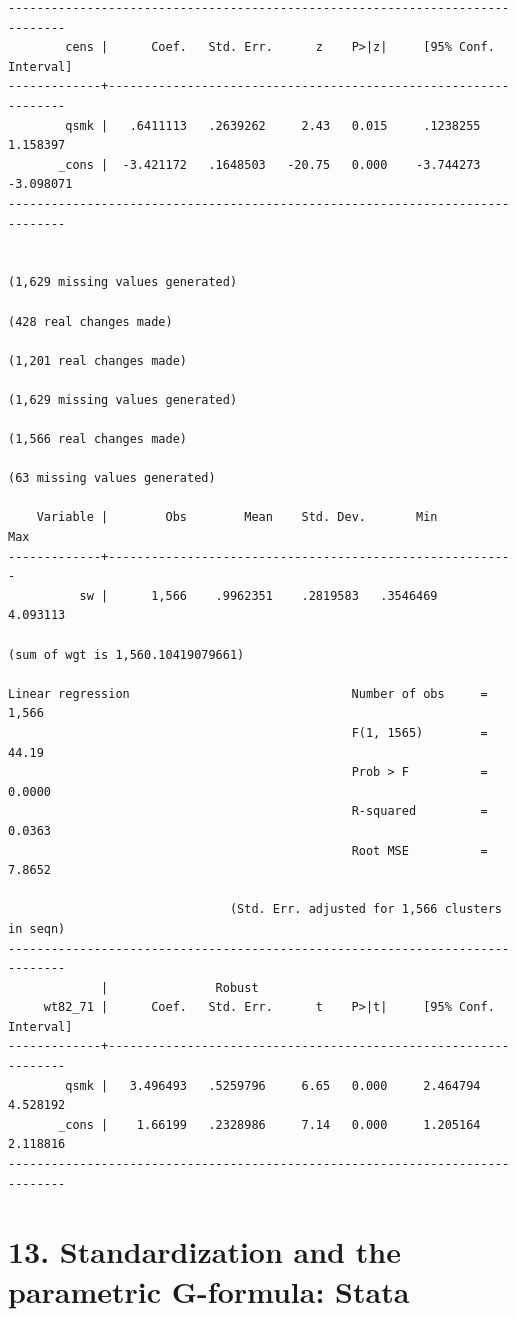 \documentclass[
  10pt,
]{book}
\begin{document}
\begin{verbatim}
------------------------------------------------------------------------------
        cens |      Coef.   Std. Err.      z    P>|z|     [95% Conf. Interval]
-------------+----------------------------------------------------------------
        qsmk |   .6411113   .2639262     2.43   0.015     .1238255    1.158397
       _cons |  -3.421172   .1648503   -20.75   0.000    -3.744273   -3.098071
------------------------------------------------------------------------------


(1,629 missing values generated)

(428 real changes made)

(1,201 real changes made)

(1,629 missing values generated)

(1,566 real changes made)

(63 missing values generated)

    Variable |        Obs        Mean    Std. Dev.       Min        Max
-------------+---------------------------------------------------------
          sw |      1,566    .9962351    .2819583   .3546469   4.093113

(sum of wgt is 1,560.10419079661)

Linear regression                               Number of obs     =      1,566
                                                F(1, 1565)        =      44.19
                                                Prob > F          =     0.0000
                                                R-squared         =     0.0363
                                                Root MSE          =     7.8652

                               (Std. Err. adjusted for 1,566 clusters in seqn)
------------------------------------------------------------------------------
             |               Robust
     wt82_71 |      Coef.   Std. Err.      t    P>|t|     [95% Conf. Interval]
-------------+----------------------------------------------------------------
        qsmk |   3.496493   .5259796     6.65   0.000     2.464794    4.528192
       _cons |    1.66199   .2328986     7.14   0.000     1.205164    2.118816
------------------------------------------------------------------------------
\end{verbatim}

\hypertarget{standardization-and-the-parametric-g-formula-stata}{%
\chapter*{13. Standardization and the parametric G-formula: Stata}\label{standardization-and-the-parametric-g-formula-stata}}
\end{document}
